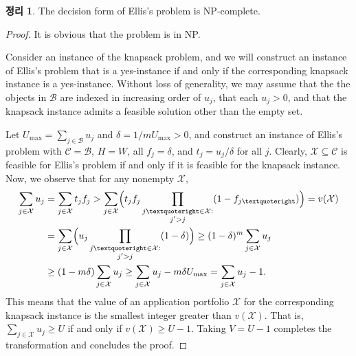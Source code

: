 \documentclass[12pt]{article} %
\newtheorem{theorem}{Theorem}
\theoremstyle{definition}
\newtheorem{theorem}{정리}
\theoremstyle{definition}
\begin{document}
\begin{theorem}
The decision form of Ellis’s problem is NP-complete.
\end{theorem}

\begin{proof}It is obvious that the problem is in NP.

Consider an instance of the knapsack problem, and we will construct an instance of Ellis’s problem that is a yes-instance if and only if the corresponding knapsack instance is a yes-instance. Without loss of generality, we may assume that the the objects in $\mathcal{B}$ are indexed in increasing order of $u_j$, that each $u_j >0$, and that the knapsack instance admits a feasible solution other than the empty set. 

Let $U_{\mathrm{max}} = \sum_{j \in \mathcal{B}} u_j$ and $\delta = {1} /{m U_{\mathrm{max}}} > 0$, and construct an instance of Ellis’s problem with $\mathcal{C} = \mathcal{B}$, $H = W$, all $f_j = \delta$, and $t_j = u_j / \delta$ for all $j$. Clearly, $\mathcal{X} \subseteq \mathcal{C}$ is feasible for Ellis’s problem if and only if it is feasible for the knapsack instance. Now, we observe that for any nonempty $\mathcal{X}$,
\begin{align}
\begin{split}
\sum_{j \in \mathcal{X}} u_j &=  \sum_{j \in \mathcal{X}} t_j f_j 
> \sum_{j \in \mathcal{X}} \Bigl( t_j f_j  \prod_{\substack{j’ \in \mathcal{X}: \\ j' > j}} (1 - f_{j’}) \Bigr)
= v(\mathcal{X}) \\
&= \sum_{j \in \mathcal{X}} \Bigl( u_j  \prod_{\substack{j’ \in \mathcal{X}: \\ j' > j}} (1 - \delta) \Bigr)
\geq (1 - \delta)^m \sum_{j \in \mathcal{X}} u_j \\
&\geq (1 - m\delta) \sum_{j \in \mathcal{X}} u_j 
\geq \sum_{j \in \mathcal{X}} u_j  - m\delta U_{\mathrm{max}}
= \sum_{j \in \mathcal{X}} u_j  - 1.
\end{split}
\end{align}
This means that the value of an application portfolio $\mathcal{X}$ for the corresponding knapsack instance is the smallest integer greater than $v( \mathcal{X})$. That is, $\sum_{j \in \mathcal{X}} u_j \geq U$ if and only if $v(\mathcal{X}) \geq U -1$. Taking $V = U-1$ completes the transformation and concludes the proof.  \end{proof}
\end{document}

